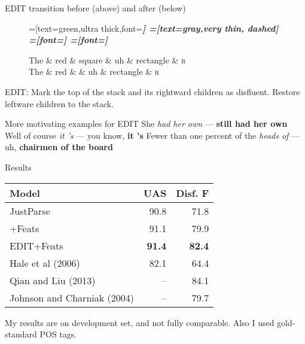 \documentclass{lecture}
\begin{document}
\begin{plain}{EDIT transition before (above) and after (below)}
\begin{figure}
    \centering
    \begin{dependency}[theme=simple]
    =[text=green,ultra thick,font=\bfseries\itshape]
    =[text=gray,very thin, dashed]
    =[font=\bfseries\itshape]
    =[font=\itshape]
    \begin{deptext}[column sep=.075cm, row sep=.1ex]
        The \& red \& square \& uh \& rectangle \&  \textsc{r} \\
        The \& red \&  \& uh \& rectangle \&  \textsc{r} \\
    \end{deptext}
\end{dependency}
\end{figure}
EDIT: Mark the top of the stack and its rightward children as disfluent. Restore
leftware children to the stack.
\end{plain}

\begin{points}{More motivating examples for EDIT}
    \p She \emph{had her own} --- \textbf{still had her own}
    \p Well of course \emph{it 's} --- you know, \textbf{it 's}
    \p Fewer than one percent of the \emph{heads of} --- uh, \textbf{chairmen of the board}
    \p 
\end{points}

\begin{plain}{Results}
    \begin{table}
    \begin{tabular}{l|rr}
        \hline
        Model         & UAS  & Disf. F \\
        \hline \hline
        JustParse     & 90.8 & 71.8  \\
        +Feats        & 91.1 & 79.9 \\
        EDIT+Feats    & \textbf{91.4} & \textbf{82.4} \\
        \hline
        Hale et al (2006) & 82.1 & 64.4 \\
        Qian and Liu (2013)         & -- & 84.1 \\
        Johnson and Charniak (2004) & -- & 79.7 \\
        \hline
    \end{tabular}
    \centering
\end{table}
My results are on development set, and not fully comparable. Also I used gold-standard
POS tags.
\end{plain}
\end{document}

